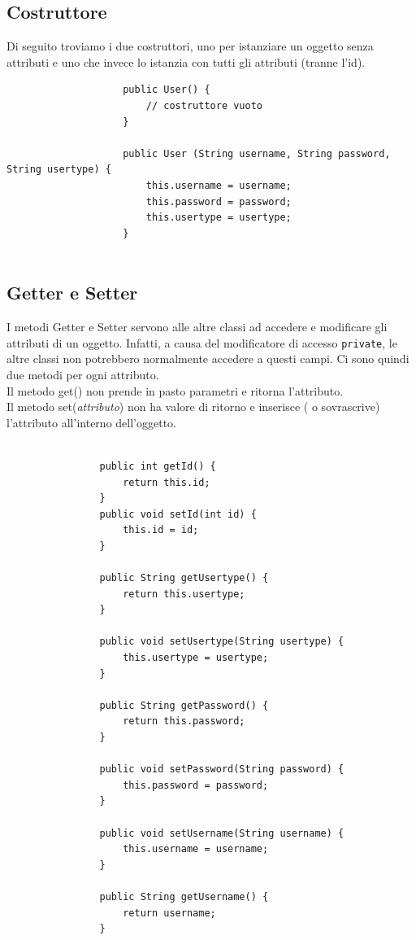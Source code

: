 \documentclass[a4paper,12 pt]{article}
\begin{document}
			\subsection{Costruttore}
			Di seguito troviamo i due costruttori, uno per istanziare un oggetto senza attributi e uno che invece lo istanzia con tutti gli attributi (tranne l'id).
				\begin{lstlisting}
					public User() {
						// costruttore vuoto
					}
					
					public User (String username, String password, String usertype) {
						this.username = username;
						this.password = password;
						this.usertype = usertype;
					}
				
				\end{lstlisting}
				
			\subsection{Getter e Setter}
			I metodi Getter e Setter servono alle altre classi ad accedere e modificare gli attributi di un oggetto. Infatti, a causa del modificatore di accesso \texttt{private}, le altre classi non potrebbero normalmente accedere a questi campi. Ci sono quindi due metodi per ogni attributo.\\
			 Il metodo get() non prende in pasto parametri e ritorna l'attributo.\\
			  Il metodo set(\textit{attributo}) non ha valore di ritorno e inserisce ( o sovrascrive) l'attributo all'interno dell'oggetto.
				\begin{lstlisting}
	
				public int getId() {
					return this.id;
				}
				public void setId(int id) {
					this.id = id;
				}
				
				public String getUsertype() {
					return this.usertype;
				}
				
				public void setUsertype(String usertype) {
					this.usertype = usertype;
				}
				
				public String getPassword() {
					return this.password;
				}
				
				public void setPassword(String password) {
					this.password = password;
				}
				
				public void setUsername(String username) {
					this.username = username;
				}
				
				public String getUsername() {
					return username;
				}
				\end{lstlisting}
				
\end{document}
